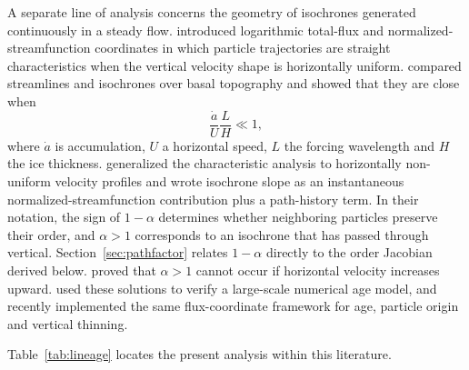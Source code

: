 \documentclass[review]{igs}
\newcommand{\textcite}{\citet}
\theoremstyle{definition}
\theoremstyle{remark}
\begin{document}
A separate line of analysis concerns the geometry of isochrones generated continuously in a steady flow. \textcite{ParreninHindmarshRemy2006} introduced logarithmic total-flux and normalized-streamfunction coordinates in which particle trajectories are straight characteristics when the vertical velocity shape is horizontally uniform. \textcite{Hindmarsh2006} compared streamlines and isochrones over basal topography and showed that they are close when
\begin{equation}
\frac{\dot a}{U}\frac{L}{H}\ll1,
\label{eq:hindmarshscale}
\end{equation}
where \(\dot a\) is accumulation, \(U\) a horizontal speed, \(L\) the forcing wavelength and \(H\) the ice thickness. \textcite{ParreninHindmarsh2007} generalized the characteristic analysis to horizontally non-uniform velocity profiles and wrote isochrone slope as an instantaneous normalized-streamfunction contribution plus a path-history term. In their notation, the sign of \(1-\alpha\) determines whether neighboring particles preserve their order, and \(\alpha>1\) corresponds to an isochrone that has passed through vertical. Section~\ref{sec:pathfactor} relates \(1-\alpha\) directly to the order Jacobian derived below. \textcite{ParreninHindmarsh2007} proved that \(\alpha>1\) cannot occur if horizontal velocity increases upward. \textcite{HindmarshLeysingerVieliParrenin2009} used these solutions to verify a large-scale numerical age model, and \textcite{ParreninChungMartin2025} recently implemented the same flux-coordinate framework for age, particle origin and vertical thinning.

Table~\ref{tab:lineage} locates the present analysis within this literature.
\end{document}
